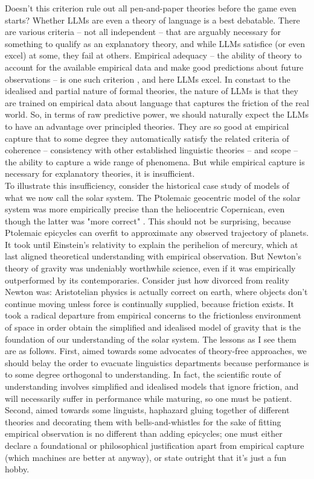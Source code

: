 \begin{fullwidth}
\begin{multicols}{2}
Doesn't this criterion rule out all pen-and-paper theories before the game even starts? Whether LLMs are even a theory of language is a best debatable. There are various criteria -- not all independent -- that are arguably necessary for something to qualify as an explanatory theory, and while LLMs satisfice (or even excel) at some, they fail at others. Empirical adequacy -- the ability of theory to account for the available empirical data and make good predictions about future observations -- is one such criterion \citep{}, and here LLMs excel. In constast to the idealised and partial nature of formal theories, the nature of LLMs is that they are trained on empirical data about language that captures the friction of the real world. So, in terms of raw predictive power, we should naturally expect the LLMs to have an advantage over principled theories. They are so good at empirical capture that to some degree they automatically satisfy the related criteria of coherence -- consistency with other established linguistic theories -- and scope -- the ability to capture a wide range of phenomena. But while empirical capture is necessary for explanatory theories, it is insufficient.\\

To illustrate this insufficiency, consider the historical case study of models of what we now call the solar system. The Ptolemaic geocentric model of the solar system was more empirically precise than the heliocentric Copernican, even though the latter was "more correct" \citep{}. This should not be surprising, because Ptolemaic epicycles can overfit to approximate any observed trajectory of planets. It took until Einstein's relativity to explain the perihelion of mercury, which at last aligned theoretical understanding with empirical observation. But Newton's theory of gravity was undeniably worthwhile science, even if it was empirically outperformed by its contemporaries. Consider just how divorced from reality Newton was: Aristotelian physics is actually correct on earth, where objects don't continue moving unless force is continually supplied, because friction exists. It took a radical departure from empirical concerns to the frictionless environment of space in order obtain the simplified and idealised model of gravity that is the foundation of our understanding of the solar system. The lessons as I see them are as follows. First, aimed towards some advocates of theory-free approaches, we should belay the order to evacuate linguistics departments because performance is to some degree orthogonal to understanding. In fact, the scientific route of understanding involves simplified and idealised models that ignore friction, and will necessarily suffer in performance while maturing, so one must be patient. Second, aimed towards some linguists, haphazard gluing together of different theories and decorating them with bells-and-whistles for the sake of fitting empirical observation is no different than adding epicycles; one must either declare a foundational or philosophical justification apart from empirical capture (which machines are better at anyway), or state outright that it's just a fun hobby.\\


\end{multicols}
\end{fullwidth}
